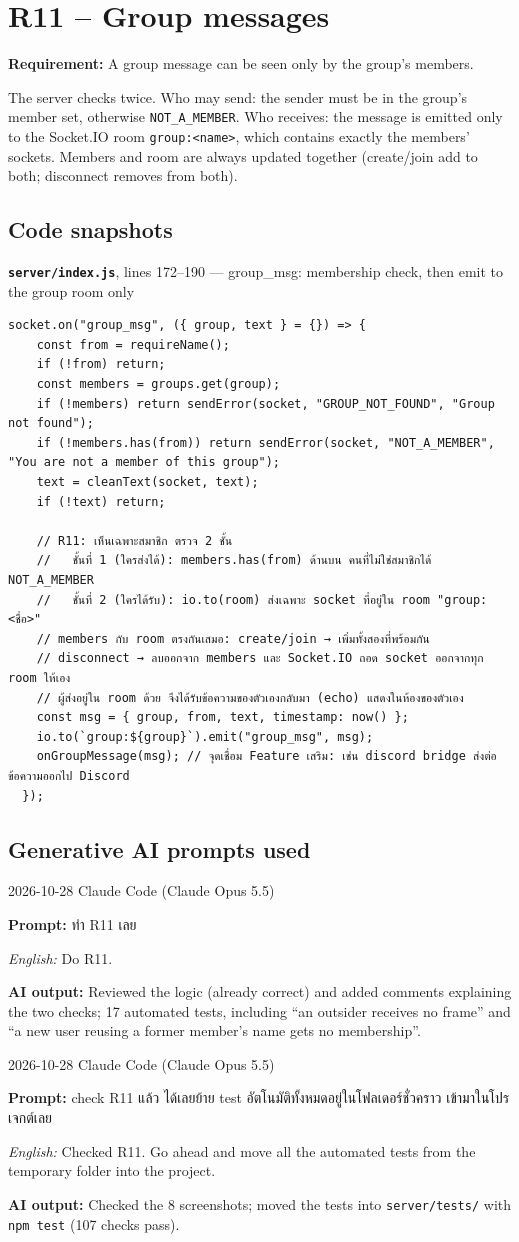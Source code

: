 \documentclass[11pt,a4paper]{article}
\newcommand{\code}[1]{\texttt{#1}}
\newcommand{\req}[1]{\begin{tcolorbox}[colback=accent!6,colframe=accent!60,boxrule=0.5pt,left=4pt,right=4pt,top=2pt,bottom=2pt]\textbf{Requirement:} #1\end{tcolorbox}}
\newcommand{\snap}[3]{\par\medskip\textbf{\code{#1}}, lines #2 --- #3}
\newcommand{\promptbox}[4]{%
\begin{tcolorbox}[colback=codebg,colframe=gray!50,boxrule=0.4pt,left=4pt,right=4pt,top=2pt,bottom=2pt]
{\small #1 \quad Claude Code (Claude Opus 5.5)}\par
\textbf{Prompt:} #2\par
\textit{English:} #3\par
\textbf{AI output:} #4
\end{tcolorbox}}
\begin{document}
\clearpage
\section{R11 -- Group messages}
\req{A group message can be seen only by the group's members.}

The server checks twice. Who may send: the sender must be in the group's member set,
otherwise \code{NOT\_A\_MEMBER}. Who receives: the message is emitted only to the Socket.IO room
\code{group:<name>}, which contains exactly the members' sockets. Members and room are always
updated together (create/join add to both; disconnect removes from both).

\subsection*{Code snapshots}
\snap{server/index.js}{172--190}{group\_msg: membership check, then emit to the group room only}
\begin{Verbatim}[firstnumber=172]
  socket.on("group_msg", ({ group, text } = {}) => {
    const from = requireName();
    if (!from) return;
    const members = groups.get(group);
    if (!members) return sendError(socket, "GROUP_NOT_FOUND", "Group not found");
    if (!members.has(from)) return sendError(socket, "NOT_A_MEMBER", "You are not a member of this group");
    text = cleanText(socket, text);
    if (!text) return;

    // R11: เห็นเฉพาะสมาชิก ตรวจ 2 ชั้น
    //   ชั้นที่ 1 (ใครส่งได้): members.has(from) ด้านบน คนที่ไม่ใช่สมาชิกได้ NOT_A_MEMBER
    //   ชั้นที่ 2 (ใครได้รับ): io.to(room) ส่งเฉพาะ socket ที่อยู่ใน room "group:<ชื่อ>"
    // members กับ room ตรงกันเสมอ: create/join → เพิ่มทั้งสองที่พร้อมกัน
    // disconnect → ลบออกจาก members และ Socket.IO ถอด socket ออกจากทุก room ให้เอง
    // ผู้ส่งอยู่ใน room ด้วย จึงได้รับข้อความของตัวเองกลับมา (echo) แสดงในห้องของตัวเอง
    const msg = { group, from, text, timestamp: now() };
    io.to(`group:${group}`).emit("group_msg", msg);
    onGroupMessage(msg); // จุดเชื่อม Feature เสริม: เช่น discord bridge ส่งต่อข้อความออกไป Discord
  });
\end{Verbatim}

\subsection*{Generative AI prompts used}
\promptbox{2026-10-28}{ทำ R11 เลย}{Do R11.}{Reviewed the logic (already correct) and added comments explaining the two checks; 17 automated tests, including “an outsider receives no frame” and “a new user reusing a former member's name gets no membership”.}
\promptbox{2026-10-28}{check R11 แล้ว \newline ได้เลยย้าย test อัตโนมัติทั้งหมดอยู่ในโฟลเดอร์ชั่วคราว เข้ามาในโปรเจกต์เลย}{Checked R11. Go ahead and move all the automated tests from the temporary folder into the project.}{Checked the 8 screenshots; moved the tests into \code{server/tests/} with \code{npm test} (107 checks pass).}
\end{document}
